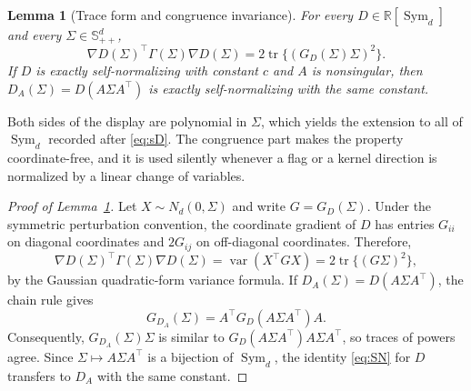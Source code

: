 \documentclass[12pt,a4paper]{article}
\theoremstyle{plain}
\newtheorem{lemma}{Lemma}
\theoremstyle{definition}
\newcommand{\R}{\mathbb{R}}
\newcommand{\Smat}{\mathbb{S}}
\newcommand{\Sym}{\operatorname{Sym}}
\newcommand{\tr}{\operatorname{tr}}
\newcommand{\var}{\operatorname{var}}
\begin{document}
\begin{lemma}[Trace form and congruence invariance]
\label{lem:trace-main}
    For every $D\in\R[\Sym_d]$ and every $\Sigma\in\Smat^d_{++}$,
    \begin{equation*}
        \nabla D(\Sigma)^\top\Gamma(\Sigma)\nabla D(\Sigma)
        =
        2\tr\{(G_D(\Sigma)\Sigma)^2\}
        .
    \end{equation*}
    If $D$ is exactly self-normalizing with constant $c$ and $A$ is nonsingular, then $D_A(\Sigma)=D(A\Sigma A^\top)$ is exactly self-normalizing with the same constant.
\end{lemma}

Both sides of the display are polynomial in $\Sigma$, which yields the extension to all of $\Sym_d$ recorded after \eqref{eq:sD}.
The congruence part makes the property coordinate-free, and it is used silently whenever a flag or a kernel direction is normalized by a linear change of variables.

\begin{proof}[Proof of Lemma~\ref{lem:trace-main}]
    Let $X\sim N_d(0,\Sigma)$ and write $G=G_D(\Sigma)$.
    Under the symmetric perturbation convention, the coordinate gradient of $D$ has entries $G_{ii}$ on diagonal coordinates and $2G_{ij}$ on off-diagonal coordinates.
    Therefore,
    \begin{equation*}
        \nabla D(\Sigma)^\top\Gamma(\Sigma)\nabla D(\Sigma)
        =
        \var(X^\top GX)
        =
        2\tr\{(G\Sigma)^2\}
        ,
    \end{equation*}
    by the Gaussian quadratic-form variance formula.
    If $D_A(\Sigma)=D(A\Sigma A^\top)$, the chain rule gives
    \begin{equation*}
        G_{D_A}(\Sigma)
        =
        A^\top G_D(A\Sigma A^\top)A
        .
    \end{equation*}
    Consequently, $G_{D_A}(\Sigma)\Sigma$ is similar to $G_D(A\Sigma A^\top)A\Sigma A^\top$, so traces of powers agree.
    Since $\Sigma\mapsto A\Sigma A^\top$ is a bijection of $\Sym_d$, the identity \eqref{eq:SN} for $D$ transfers to $D_A$ with the same constant.
\end{proof}
\end{document}
